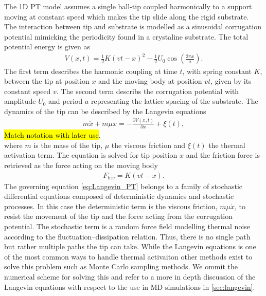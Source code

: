 The 1D \acrshort{PT} model assumes a single ball-tip coupled harmonically to a support moving at constant speed which makes the tip slide along the rigid substrate. The interaction between tip and substrate is modelled as a sinusoidal corrugation potential mimicking the periodicity found in a crystaline substrate. The total potential energy is given as
\begin{align}
  V(x,t) = \frac{1}{2}K(vt - x)^2 - \frac{1}{2}U_0 \cos \left(\frac{2\pi x}{a} \right).
  \label{eq:V_PT}
\end{align}
The first term describes the harmonic coupling at time $t$, with spring constant $K$, between the tip at position $x$ and the moving body at position $vt$, given by its constant speed $v$. The second term describs the corrugation potential with amplitude $U_0$ and period $a$ representing the lattice spacing of the substrate. The dynamics of the tip can be described by the Langevin equations 
\begin{align}
  m \ddot{x}+m \mu \dot{x}=-\frac{\partial V(x, t)}{\partial x}+\xi(t),
  \label{eq:Langevin_PT}
\end{align}
\hl{Match notation with later use}. \\
where $m$ is the mass of the tip, $\mu$ the viscous friction and $\xi(t)$ the thermal activation term. The equation is solved for tip position $x$ and the friction force is retrieved as the force acting on the moving body
\begin{align*}
  F_{\text{fric}} = K(vt - x).
\end{align*}
The governing equation \cref{eq:Langevin_PT} belongs to a family of stochastic differential equations composed of deterministic dynamics and stochastic processes. In this case the deterministic term is the viscous friction, $m\mu\dot{x}$, to resist the movement of the tip and the force acting from the corrugation potential. The stochastic term is a random force field modelling thermal noise according to the fluctuation–dissipation relation. Thus, there is no single path but rather multiple paths the tip can take. While the Langevin equations is one of the most common ways to handle thermal activaiton other methods exist to solve this problem such as Monte Carlo sampling methods. We ommit the numerical scheme for solving this and refer to a more in depth discussion of the Langevin equations with respect to the use in \acrshort{MD} simulations in \cref{sec:langevin}. 


